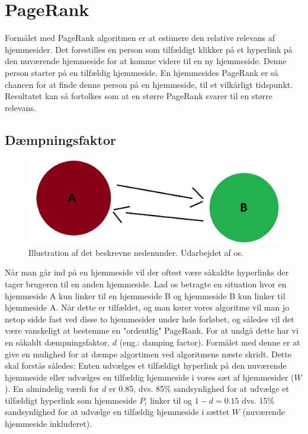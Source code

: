 \section{PageRank}
Formålet med PageRank algoritmen er at estimere den relative relevans af hjemmesider. Det forestilles en person som tilfældigt klikker på et hyperlink på den nuværende hjemmeside for at komme videre til en ny hjemmeside. Denne person starter på en tilfældig hjemmeside. En hjemmesides PageRank er så chancen for at finde denne person på en hjemmeside, til et vilkårligt tidspunkt. Resultatet kan så fortolkes som at en større PageRank svarer til en større relevans.

\subsection{Dæmpningsfaktor}
\begin{figure}[!h]
    \centering
    \includegraphics[width = \linewidth]{Billeder/damping_fac.png}
    \caption{Illustration af det beskrevne nedenunder. Udarbejdet af os.}
    \label{fig:my_label}
\end{figure}

Når man går ind på en hjemmeside vil der oftest være såkaldte hyperlinks der tager brugeren til en anden hjemmeside. Lad os betragte en situation hvor en hjemmeside A kun linker til en hjemmeside B og hjemmeside B kun linker til hjemmeside A. Når dette er tilfældet, og man kører vores algoritme vil man jo netop sidde fast ved disse to hjemmesider under hele forløbet, og således vil det være vanskeligt at bestemme en "ordentlig"  PageRank. For at undgå dette har vi en såkaldt dæmpningsfaktor, $d$ (eng.: damping factor). Formålet med denne er at give en mulighed for at dæmpe algortimen ved algoritmens næste skridt. Dette skal forstås således: Enten udvælges et tilfældigt hyperlink på den nuværende hjemmeside eller udvælges en tilfældig hjemmeside i vores sæt af hjemmesider ($W$). En almindelig værdi for $d$ er 0.85, dvs. 85\% sandsynlighed for at udvælge et tilfældigt hyperlink som hjemmeside $P_i$ linker til og $1 - d = 0.15$ dvs. 15\% sandsynlighed for at udvælge en tilfældig hjemmeside i sættet $W$ (nuværende hjemmeside inkluderet).

